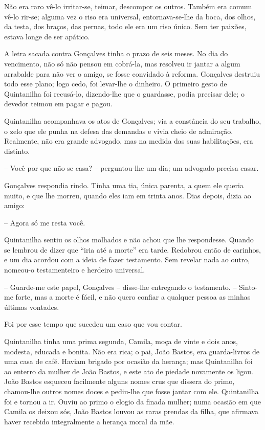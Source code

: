 Não era raro vê-lo irritar-se, teimar, descompor os outros. Também era
comum vê-lo rir-se; alguma vez o riso era universal, entornava-se-lhe da
boca, dos olhos, da testa, dos braços, das pernas, todo ele era um riso
único. Sem ter paixões, estava longe de ser apático.

A letra sacada contra Gonçalves tinha o prazo de seis meses. No dia do
vencimento, não só não pensou em cobrá-la, mas resolveu ir jantar a
algum arrabalde para não ver o amigo, se fosse convidado à reforma.
Gonçalves destruiu todo esse plano; logo cedo, foi levar-lhe o dinheiro.
O primeiro gesto de Quintanilha foi recusá-lo, dizendo-lhe que o
guardasse, podia precisar dele; o devedor teimou em pagar e pagou.

Quintanilha acompanhava os atos de Gonçalves; via a constância do seu
trabalho, o zelo que ele punha na defesa das demandas e vivia cheio de
admiração. Realmente, não era grande advogado, mas na medida das suas
habilitações, era distinto.

-- Você por que não se casa? -- perguntou-lhe um dia; um advogado
precisa casar.

Gonçalves respondia rindo. Tinha uma tia, única parenta, a quem ele
queria muito, e que lhe morreu, quando eles iam em trinta anos. Dias
depois, dizia ao amigo:

-- Agora só me resta você.

Quintanilha sentiu os olhos molhados e não achou que lhe respondesse.
Quando se lembrou de dizer que ``iria até a morte'' era tarde. Redobrou
então de carinhos, e um dia acordou com a ideia de fazer testamento. Sem
revelar nada ao outro, nomeou-o testamenteiro e herdeiro universal.

-- Guarde-me este papel, Gonçalves -- disse-lhe entregando o testamento.
-- Sinto-me forte, mas a morte é fácil, e não quero confiar a qualquer
pessoa as minhas últimas vontades.

Foi por esse tempo que sucedeu um caso que vou contar.

Quintanilha tinha uma prima segunda, Camila, moça de vinte e dois anos,
modesta, educada e bonita. Não era rica; o pai, João Bastos, era
guarda-livros de uma casa de café. Haviam brigado por ocasião da
herança; mas Quintanilha foi ao enterro da mulher de João Bastos, e este
ato de piedade novamente os ligou. João Bastos esqueceu facilmente
alguns nomes crus que dissera do primo, chamou-lhe outros nomes doces e
pediu-lhe que fosse jantar com ele. Quintanilha foi e tornou a ir. Ouviu
ao primo o elogio da finada mulher; numa ocasião em que Camila os deixou
sós, João Bastos louvou as raras prendas da filha, que afirmava haver
recebido integralmente a herança moral da mãe.

